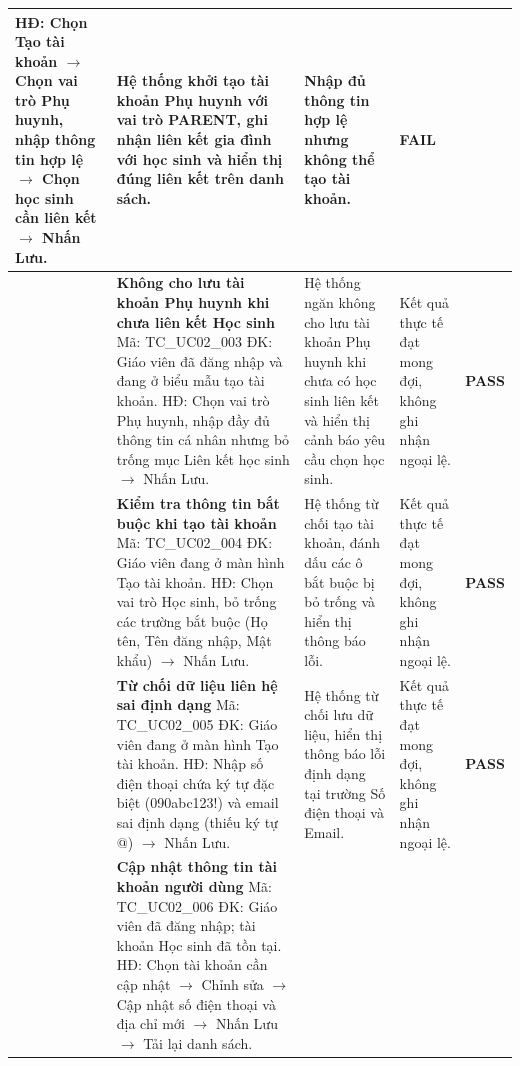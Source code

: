 \begin{longtable}{|>{\centering\arraybackslash}p{0.8cm}|>{\raggedright\arraybackslash}p{4.6cm}|>{\raggedright\arraybackslash}p{3.8cm}|>{\raggedright\arraybackslash}p{3.8cm}|>{\centering\arraybackslash}p{1.5cm}|}
HĐ: Chọn Tạo tài khoản $\rightarrow$ Chọn vai trò Phụ huynh, nhập thông tin hợp lệ $\rightarrow$ Chọn học sinh cần liên kết $\rightarrow$ Nhấn Lưu. &
Hệ thống khởi tạo tài khoản Phụ huynh với vai trò PARENT, ghi nhận liên kết gia đình với học sinh và hiển thị đúng liên kết trên danh sách. &
Nhập đủ thông tin hợp lệ nhưng không thể tạo tài khoản. & \textbf{FAIL} \\
\hline
3 & \textbf{Không cho lưu tài khoản Phụ huynh khi chưa liên kết Học sinh}\newline
Mã: TC\_UC02\_003\newline
ĐK: Giáo viên đã đăng nhập và đang ở biểu mẫu tạo tài khoản.\newline
HĐ: Chọn vai trò Phụ huynh, nhập đầy đủ thông tin cá nhân nhưng bỏ trống mục Liên kết học sinh $\rightarrow$ Nhấn Lưu. &
Hệ thống ngăn không cho lưu tài khoản Phụ huynh khi chưa có học sinh liên kết và hiển thị cảnh báo yêu cầu chọn học sinh. &
Kết quả thực tế đạt mong đợi, không ghi nhận ngoại lệ. & \textbf{PASS} \\
\hline
4 & \textbf{Kiểm tra thông tin bắt buộc khi tạo tài khoản}\newline
Mã: TC\_UC02\_004\newline
ĐK: Giáo viên đang ở màn hình Tạo tài khoản.\newline
HĐ: Chọn vai trò Học sinh, bỏ trống các trường bắt buộc (Họ tên, Tên đăng nhập, Mật khẩu) $\rightarrow$ Nhấn Lưu. &
Hệ thống từ chối tạo tài khoản, đánh dấu các ô bắt buộc bị bỏ trống và hiển thị thông báo lỗi. &
Kết quả thực tế đạt mong đợi, không ghi nhận ngoại lệ. & \textbf{PASS} \\
\hline
5 & \textbf{Từ chối dữ liệu liên hệ sai định dạng}\newline
Mã: TC\_UC02\_005\newline
ĐK: Giáo viên đang ở màn hình Tạo tài khoản.\newline
HĐ: Nhập số điện thoại chứa ký tự đặc biệt (090abc123!) và email sai định dạng (thiếu ký tự @) $\rightarrow$ Nhấn Lưu. &
Hệ thống từ chối lưu dữ liệu, hiển thị thông báo lỗi định dạng tại trường Số điện thoại và Email. &
Kết quả thực tế đạt mong đợi, không ghi nhận ngoại lệ. & \textbf{PASS} \\
\hline
6 & \textbf{Cập nhật thông tin tài khoản người dùng}\newline
Mã: TC\_UC02\_006\newline
ĐK: Giáo viên đã đăng nhập; tài khoản Học sinh đã tồn tại.\newline
HĐ: Chọn tài khoản cần cập nhật $\rightarrow$ Chỉnh sửa $\rightarrow$ Cập nhật số điện thoại và địa chỉ mới $\rightarrow$ Nhấn Lưu $\rightarrow$ Tải lại danh sách. &

\end{longtable}
